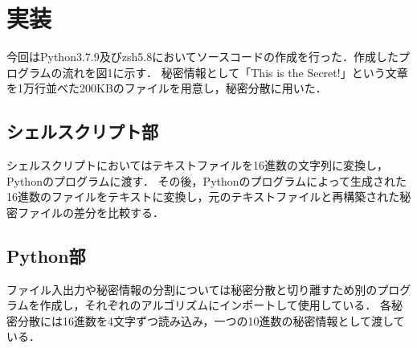 \documentclass[twocolumn]{jarticle}
\begin{document}
\section{実装}
今回はPython3.7.9及びzsh5.8においてソースコードの作成を行った．作成したプログラムの流れを図1に示す．
%
秘密情報として「This is the Secret!」という文章を1万行並べた200KBのファイルを用意し，秘密分散に用いた．

\subsection{シェルスクリプト部}
シェルスクリプトにおいてはテキストファイルを16進数の文字列に変換し，Pythonのプログラムに渡す．
%
その後，Pythonのプログラムによって生成された16進数のファイルをテキストに変換し，元のテキストファイルと再構築された秘密ファイルの差分を比較する．

\subsection{Python部}
ファイル入出力や秘密情報の分割については秘密分散と切り離すため別のプログラムを作成し，それぞれのアルゴリズムにインポートして使用している．
%
各秘密分散には16進数を4文字ずつ読み込み，一つの10進数の秘密情報として渡している．
\end{document}
